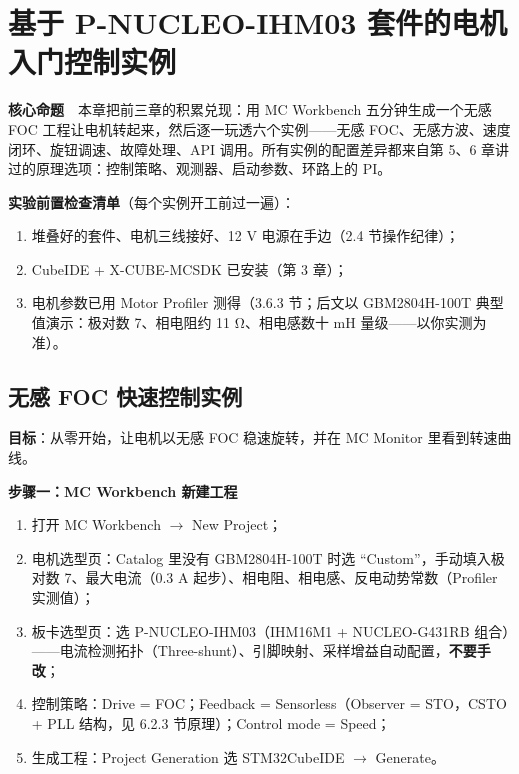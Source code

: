 \documentclass[
  UTF8,
  scheme=plain,
  fontsize=10pt,
  openany
]{ctexbook}
\begin{document}
\clearpage

\chapter{基于 P-NUCLEO-IHM03
套件的电机入门控制实例}\label{ux57faux4e8e-p-nucleo-ihm03-ux5957ux4ef6ux7684ux7535ux673aux5165ux95e8ux63a7ux5236ux5b9eux4f8b}

\begin{epigraph}

\textbf{核心命题}　本章把前三章的积累兑现：用 MC Workbench
五分钟生成一个无感 FOC 工程让电机转起来，然后逐一玩透六个实例------无感
FOC、无感方波、速度闭环、旋钮调速、故障处理、API
调用。所有实例的配置差异都来自第 5、6
章讲过的原理选项：控制策略、观测器、启动参数、环路上的 PI。

\end{epigraph}

\textbf{实验前置检查清单}（每个实例开工前过一遍）：

\begin{enumerate}
\def\labelenumi{\arabic{enumi}.}
\tightlist
\item
  堆叠好的套件、电机三线接好、12 V 电源在手边（2.4 节操作纪律）；
\item
  CubeIDE + X-CUBE-MCSDK 已安装（第 3 章）；
\item
  电机参数已用 Motor Profiler 测得（3.6.3 节；后文以 GBM2804H-100T
  典型值演示：极对数 7、相电阻约 11 Ω、相电感数十 mH
  量级------以你实测为准）。
\end{enumerate}

\section{无感 FOC
快速控制实例}\label{ux65e0ux611f-foc-ux5febux901fux63a7ux5236ux5b9eux4f8b}

\textbf{目标}：从零开始，让电机以无感 FOC 稳速旋转，并在 MC Monitor
里看到转速曲线。

\textbf{步骤一：MC Workbench 新建工程}

\begin{enumerate}
\def\labelenumi{\arabic{enumi}.}
\tightlist
\item
  打开 MC Workbench \(\rightarrow\) New Project；
\item
  电机选型页：Catalog 里没有 GBM2804H-100T 时选
  ``Custom''，手动填入极对数 7、最大电流（0.3 A
  起步）、相电阻、相电感、反电动势常数（Profiler 实测值）；
\item
  板卡选型页：选 P-NUCLEO-IHM03（IHM16M1 + NUCLEO-G431RB
  组合）------电流检测拓扑（Three-shunt）、引脚映射、采样增益自动配置，\textbf{不要手改}；
\item
  控制策略：Drive = FOC；Feedback = Sensorless（Observer = STO，CSTO +
  PLL 结构，见 6.2.3 节原理）；Control mode = Speed；
\item
  生成工程：Project Generation 选 STM32CubeIDE \(\rightarrow\)
  Generate。
\end{enumerate}
\end{document}
